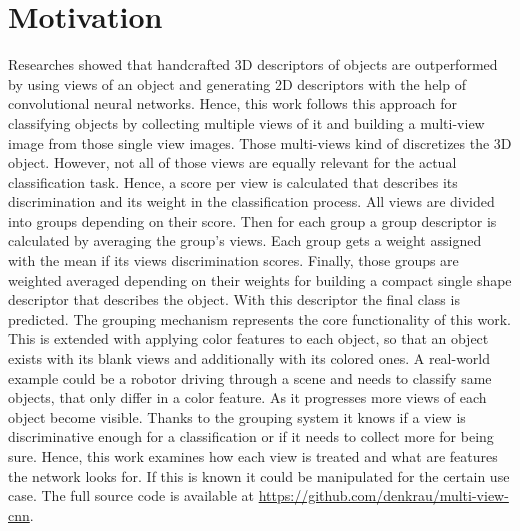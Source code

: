 \section{Motivation}
\label{sec:overview-motivation}
Researches showed that handcrafted 3D descriptors of objects are outperformed by using views of an object and generating 2D descriptors with the help of convolutional neural networks.
Hence, this work follows this approach for classifying objects by collecting multiple views of it and building a multi-view image from those single view images.
Those multi-views kind of discretizes the 3D object. 
However, not all of those views are equally relevant for the actual classification task.
Hence, a score per view is calculated that describes its discrimination and its weight in the classification process.
All views are divided into groups depending on their score.
Then for each group a group descriptor is calculated by averaging the group's views.
Each group gets a weight assigned with the mean if its views discrimination scores.
Finally, those groups are weighted averaged depending on their weights for building a compact single shape descriptor that describes the object.
With this descriptor the final class is predicted.
The grouping mechanism represents the core functionality of this work.
This is extended with applying color features to each object, so that an object exists with its blank views and additionally with its colored ones.
A real-world example could be a robotor driving through a scene and needs to classify same objects, that only differ in a color feature.
As it progresses more views of each object become visible.
Thanks to the grouping system it knows if a view is discriminative enough for a classification or if it needs to collect more for being sure.
Hence, this work examines how each view is treated and what are features the network looks for.
If this is known it could be manipulated for the certain use case.
The full source code is available at \url{https://github.com/denkrau/multi-view-cnn}.